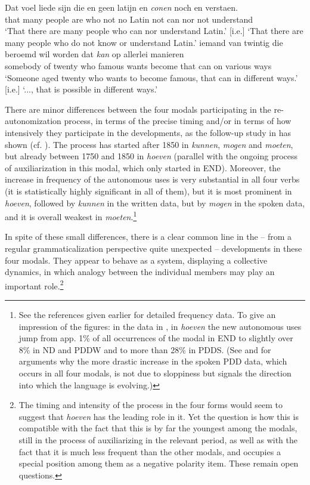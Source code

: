 \documentclass[output=paper]{langsci/langscibook}
\begin{document}
\ea%
    \label{ex:nuyts:9}
    \gll          Dat voel liede sijn die en geen latijn en \textit{conen} noch en verstaen.\\
  that many people are who not no Latin not can nor not understand\\
\glt   [lit.] `That there are many people who can nor understand Latin.' [i.e.] `That there are many people who do not know or understand Latin.'
\ex%
    \label{ex:nuyts:10}
\gll          iemand van twintig die beroemd wil worden dat \textit{kan} op allerlei manieren\\
  somebody of twenty who famous wants become that can on various ways\\
\glt   [lit.] `Someone aged twenty who wants to become famous, that can in different ways.' [i.e.] `..., that is possible in different ways.'
\z

There are minor differences between the four modals participating in the re-autonomization process, in terms of the precise timing and/or in terms of how intensively they participate in the developments, as the follow-up study in \citet{CaersNuyts2021} has shown (cf. ). The process has started after 1850 in \textit{kunnen}, \textit{mogen} and \textit{moeten}, but already between 1750 and 1850 in \textit{hoeven} (parallel with the ongoing process of auxiliarization in this modal, which only started in END). Moreover, the increase in frequency of the autonomous uses is very substantial in all four verbs (it is statistically highly significant in all of them), but it is most prominent in \textit{hoeven}, followed by \textit{kunnen} in the written data, but by \textit{mogen} in the spoken data, and it is overall weakest in \textit{moeten}.\footnote{See the references given earlier for detailed frequency data. To give an impression of the figures: in the data in \citet{CaersNuyts2021}, in \textit{hoeven} the new autonomous uses jump from app. 1\% of all occurrences of the modal in END to slightly over 8\% in ND and PDDW and to more than 28\% in PDDS. (See \citet{Nuyts2013} and \citet{CaersNuyts2021} for arguments why the more drastic increase in the spoken PDD data, which occurs in all four modals, is not due to sloppiness but signals the direction into which the language is evolving.)}

In spite of these small differences, there is a clear common line in the – from a regular grammaticalization perspective quite unexpected – developments in these four modals. They appear to behave as a system, displaying a collective dynamics, in which analogy between the individual members may play an important role.\footnote{The timing and intensity of the process in the four forms would seem to suggest that \textit{hoeven} has the leading role in it. Yet the question is how this is compatible with the fact that this is by far the youngest among the modals, still in the process of auxiliarizing in the relevant period, as well as with the fact that it is much less frequent than the other modals, and occupies a special position among them as a negative polarity item. These remain open questions.} 
\end{document}
